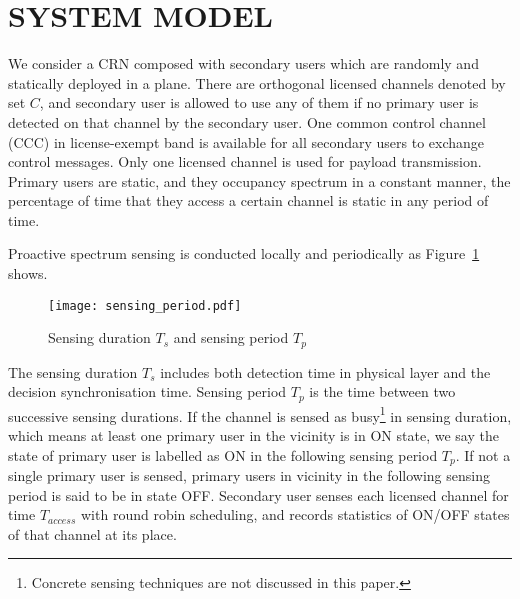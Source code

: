 \section{SYSTEM MODEL}

We consider a CRN composed with secondary users which are randomly and statically deployed in a plane.
There are orthogonal licensed channels denoted by set $C$, and secondary user is allowed to use any of them if no primary user is detected on that channel by the secondary user.
One common control channel (CCC) in license-exempt band is available for all secondary users to exchange control messages.
Only one licensed channel is used for payload transmission.
Primary users are static, and they occupancy spectrum in a constant manner, \eg the percentage of time that they access a certain channel is static in any period of time.


Proactive spectrum sensing is conducted locally and periodically as Figure~\ref{fig:sensing_period} shows. %
\begin{figure}[ht]
\centering
\texttt{[image: sensing\_period.pdf]}
\caption{Sensing duration $T_s$ and sensing period $T_p$}
\label{fig:sensing_period}
\end{figure}



The sensing duration $T_s$ includes both detection time in physical layer and the decision synchronisation time.
Sensing period $T_p$ is the time between two successive sensing durations.
If the channel is sensed as busy\footnote{Concrete sensing techniques are not discussed in this paper.} in sensing duration, which means at least one primary user in the vicinity is in ON state, we say the state of primary user is labelled as ON in the following sensing period $T_p$.
If not a single primary user is sensed, primary users in vicinity in the following sensing period is said to be in state OFF.
Secondary user senses each licensed channel for time $T_{access}$ with round robin scheduling, and records statistics of ON/OFF states of that channel at its place.


